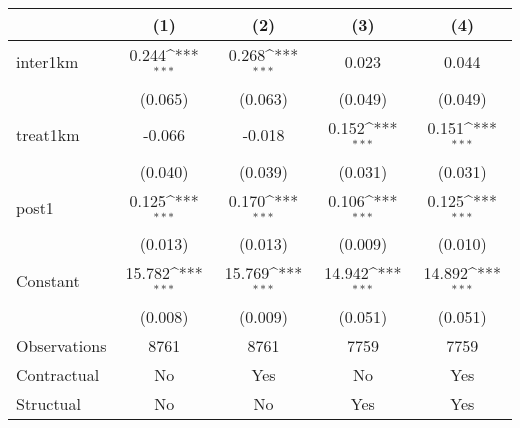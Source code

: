 {
\def\sym#1{\ifmmode^{#1}\else\(^{#1}\)\fi}
\begin{tabular}{l*{4}{c}}
\toprule
                &\multicolumn{1}{c}{(1)}         &\multicolumn{1}{c}{(2)}         &\multicolumn{1}{c}{(3)}         &\multicolumn{1}{c}{(4)}         \\
\midrule
inter1km        &    0.244\sym{***}&    0.268\sym{***}&    0.023         &    0.044         \\
                &  (0.065)         &  (0.063)         &  (0.049)         &  (0.049)         \\
\addlinespace
treat1km        &   -0.066         &   -0.018         &    0.152\sym{***}&    0.151\sym{***}\\
                &  (0.040)         &  (0.039)         &  (0.031)         &  (0.031)         \\
\addlinespace
post1           &    0.125\sym{***}&    0.170\sym{***}&    0.106\sym{***}&    0.125\sym{***}\\
                &  (0.013)         &  (0.013)         &  (0.009)         &  (0.010)         \\
\addlinespace
Constant        &   15.782\sym{***}&   15.769\sym{***}&   14.942\sym{***}&   14.892\sym{***}\\
                &  (0.008)         &  (0.009)         &  (0.051)         &  (0.051)         \\
\midrule
Observations    &     8761         &     8761         &     7759         &     7759         \\
Contractual     &       No         &      Yes         &       No         &      Yes         \\
Structual       &       No         &       No         &      Yes         &      Yes         \\
\bottomrule
\end{tabular}
}
